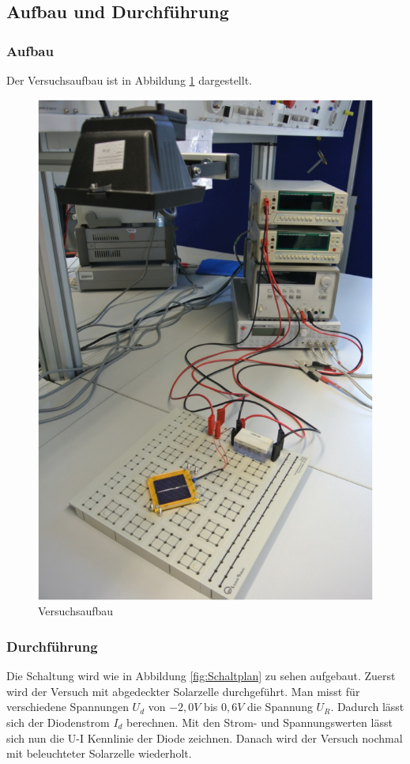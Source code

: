 \documentclass[a4paper]{scrartcl}
\numberwithin{equation}{subsection}
\begin{document}
\newpage

\subsection{Aufbau und Durchführung}
\subsubsection{Aufbau}
Der Versuchsaufbau ist in Abbildung \ref{fig:Aufbau} dargestellt.

\begin{figure}[H]
\includegraphics[width=14cm]{Aufbau}
\centering
\caption{Versuchsaufbau \cite{anl}}
\centering
\label{fig:Aufbau}
\end{figure}

\subsubsection{Durchführung}
Die Schaltung wird wie in Abbildung \ref{fig:Schaltplan} zu sehen
aufgebaut. Zuerst wird der Versuch mit abgedeckter Solarzelle durchgeführt. Man misst für verschiedene
Spannungen $U_d$ von $-2,0V$ bis $0,6V$ die Spannung $U_R$. Dadurch lässt sich der Diodenstrom $I_d$
berechnen. Mit den Strom- und Spannungswerten lässt sich nun die U-I Kennlinie der Diode zeichnen. Danach 
wird der Versuch nochmal mit beleuchteter Solarzelle wiederholt.
\end{document}
